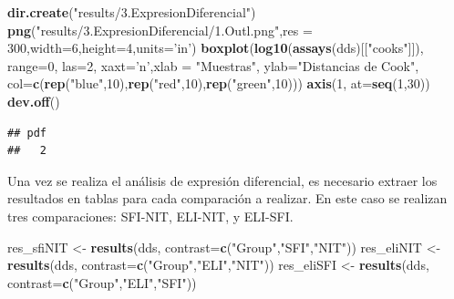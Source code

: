 \documentclass[
]{article}
\newenvironment{Shaded}{\begin{snugshade}}{\end{snugshade}}
\newcommand{\DataTypeTok}[1]{\textcolor[rgb]{0.13,0.29,0.53}{#1}}
\newcommand{\DecValTok}[1]{\textcolor[rgb]{0.00,0.00,0.81}{#1}}
\newcommand{\KeywordTok}[1]{\textcolor[rgb]{0.13,0.29,0.53}{\textbf{#1}}}
\newcommand{\NormalTok}[1]{#1}
\newcommand{\StringTok}[1]{\textcolor[rgb]{0.31,0.60,0.02}{#1}}
\begin{document}
\begin{Shaded}
\begin{Highlighting}[]
\KeywordTok{dir.create}\NormalTok{(}\StringTok{"results/3.ExpresionDiferencial"}\NormalTok{)}
\KeywordTok{png}\NormalTok{(}\StringTok{"results/3.ExpresionDiferencial/1.Outl.png"}\NormalTok{,}\DataTypeTok{res =} \DecValTok{300}\NormalTok{,}\DataTypeTok{width=}\DecValTok{6}\NormalTok{,}\DataTypeTok{height=}\DecValTok{4}\NormalTok{,}\DataTypeTok{units=}\StringTok{'in'}\NormalTok{)}
\KeywordTok{boxplot}\NormalTok{(}\KeywordTok{log10}\NormalTok{(}\KeywordTok{assays}\NormalTok{(dds)[[}\StringTok{"cooks"}\NormalTok{]]), }\DataTypeTok{range=}\DecValTok{0}\NormalTok{, }\DataTypeTok{las=}\DecValTok{2}\NormalTok{, }\DataTypeTok{xaxt=}\StringTok{'n'}\NormalTok{,}\DataTypeTok{xlab =} \StringTok{"Muestras"}\NormalTok{,}
        \DataTypeTok{ylab=}\StringTok{"Distancias de Cook"}\NormalTok{, }\DataTypeTok{col=}\KeywordTok{c}\NormalTok{(}\KeywordTok{rep}\NormalTok{(}\StringTok{"blue"}\NormalTok{,}\DecValTok{10}\NormalTok{),}\KeywordTok{rep}\NormalTok{(}\StringTok{"red"}\NormalTok{,}\DecValTok{10}\NormalTok{),}\KeywordTok{rep}\NormalTok{(}\StringTok{"green"}\NormalTok{,}\DecValTok{10}\NormalTok{)))}
\KeywordTok{axis}\NormalTok{(}\DecValTok{1}\NormalTok{, }\DataTypeTok{at=}\KeywordTok{seq}\NormalTok{(}\DecValTok{1}\NormalTok{,}\DecValTok{30}\NormalTok{))}
\KeywordTok{dev.off}\NormalTok{()}
\end{Highlighting}
\end{Shaded}

\begin{verbatim}
## pdf 
##   2
\end{verbatim}

Una vez se realiza el análisis de expresión diferencial, es necesario
extraer los resultados en tablas para cada comparación a realizar. En
este caso se realizan tres comparaciones: SFI-NIT, ELI-NIT, y ELI-SFI.

\begin{Shaded}
\begin{Highlighting}[]
\NormalTok{res_sfiNIT <-}\StringTok{ }\KeywordTok{results}\NormalTok{(dds, }\DataTypeTok{contrast=}\KeywordTok{c}\NormalTok{(}\StringTok{"Group"}\NormalTok{,}\StringTok{"SFI"}\NormalTok{,}\StringTok{"NIT"}\NormalTok{))}
\NormalTok{res_eliNIT <-}\StringTok{ }\KeywordTok{results}\NormalTok{(dds, }\DataTypeTok{contrast=}\KeywordTok{c}\NormalTok{(}\StringTok{"Group"}\NormalTok{,}\StringTok{"ELI"}\NormalTok{,}\StringTok{"NIT"}\NormalTok{))}
\NormalTok{res_eliSFI <-}\StringTok{ }\KeywordTok{results}\NormalTok{(dds, }\DataTypeTok{contrast=}\KeywordTok{c}\NormalTok{(}\StringTok{"Group"}\NormalTok{,}\StringTok{"ELI"}\NormalTok{,}\StringTok{"SFI"}\NormalTok{))}
\end{Highlighting}
\end{Shaded}
\end{document}
